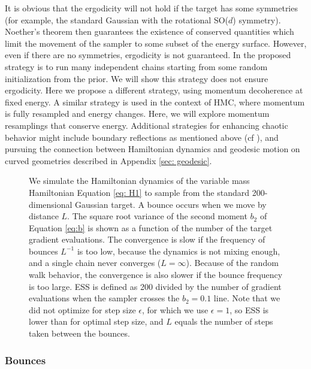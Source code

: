 \documentclass[twoside,11pt]{article}
\begin{document}
It is obvious that the ergodicity will not hold if the target has some symmetries (for example, the standard Gaussian with the rotational SO($d$) symmetry).  Noether's theorem \citep{noether} then guarantees the existence of conserved quantities which limit the movement of the sampler to some subset of the energy surface. 
However, even if there are no symmetries, 
ergodicity is not guaranteed. 
In \cite{ESH} 
the proposed strategy is to run many independent chains starting from some random 
initialization from the prior. We will 
show this strategy does not ensure 
ergodicity. 
Here we propose a different strategy, 
using momentum decoherence at fixed energy. A similar strategy is used 
in the context of HMC, where momentum 
is fully resampled and energy 
changes. Here, we will
explore momentum resamplings that 
conserve energy.
Additional strategies for enhancing chaotic behavior might include boundary reflections as mentioned above (cf \cite{PhysRevLett.77.2941}), and pursuing the connection between Hamiltonian dynamics and geodesic motion on curved geometries described in Appendix \ref{sec: geodesic}.


\begin{figure}
    \caption{We simulate the Hamiltonian dynamics of the variable mass Hamiltonian Equation \eqref{eq: H1} to sample from the standard 200-dimensional Gaussian target. A bounce occurs when we move by distance $L$. The square root variance of the second moment $b_2$ of Equation \eqref{eq:b} is shown as a function of the number of the target gradient evaluations. The convergence is slow if the frequency of bounces $L^{-1}$ is too low, because the dynamics is not mixing enough, and
    a single chain never converges ($L = \infty$).
    Because of the random walk behavior, the convergence is also slower if the bounce frequency is too large. ESS is defined as 200 divided by the number of gradient evaluations when the sampler crosses the $b_2 = 0.1$ line. Note that we did not optimize for step size $\epsilon$, for which we use $\epsilon=1$, so ESS is lower than for optimal step size, and $L$ equals the number of steps taken between the bounces.} 
    \label{fig: bounces}
\end{figure}


\subsubsection{Bounces} \label{sec: bounces}
\end{document}
